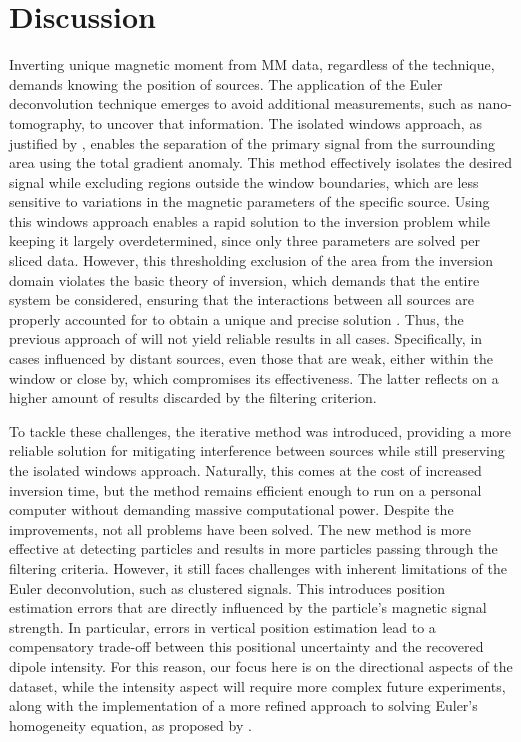 \section{Discussion}

Inverting unique magnetic moment from MM data, regardless of the technique, demands knowing the position of sources. The application of the Euler deconvolution technique emerges to avoid additional measurements, such as nano-tomography, to uncover that information. The isolated windows approach, as justified by \cite{Souza-Junior2024}, enables the separation of the primary signal from the surrounding area using the total gradient anomaly. This method effectively isolates the desired signal while excluding regions outside the window boundaries, which are less sensitive to variations in the magnetic parameters of the specific source. Using this windows approach enables a rapid solution to the inversion problem while keeping it largely overdetermined, since only three parameters are solved per sliced data. However, this thresholding exclusion of the area from the inversion domain violates the basic theory of inversion, which demands that the entire system be considered, ensuring that the interactions between all sources are properly accounted for to obtain a unique and precise solution \citep{Baratchart2013, Lima2013}. Thus, the previous approach of \cite{Souza-Junior2024} will not yield reliable results in all cases. Specifically, in cases influenced by distant sources, even those that are weak, either within the window or close by, which compromises its effectiveness. The latter reflects on a higher amount of results discarded by the filtering criterion. 

To tackle these challenges, the iterative method was introduced, providing a more reliable solution for mitigating interference between sources while still preserving the isolated windows approach. Naturally, this comes at the cost of increased inversion time, but the method remains efficient enough to run on a personal computer without demanding massive computational power. Despite the improvements, not all problems have been solved. The new method is more effective at detecting particles and results in more particles passing through the filtering criteria. However, it still faces challenges with inherent limitations of the Euler deconvolution, such as clustered signals. This introduces position estimation errors that are directly influenced by the particle's magnetic signal strength. In particular, errors in vertical position estimation lead to a compensatory trade-off between this positional uncertainty and the recovered dipole intensity. For this reason, our focus here is on the directional aspects of the dataset, while the intensity aspect will require more complex future experiments, along with the implementation of a more refined approach to solving Euler's homogeneity equation, as proposed by \citet{Uieda2024}.

